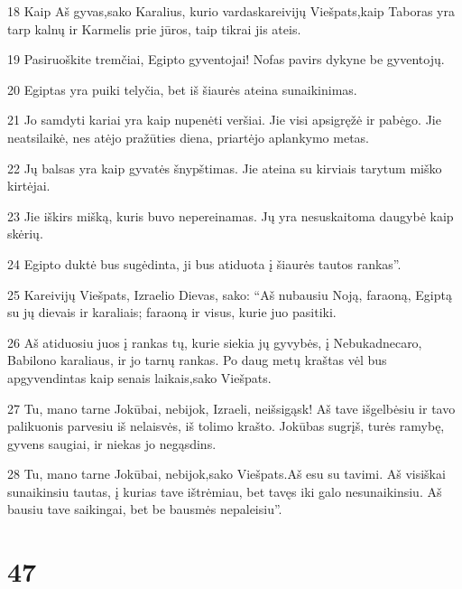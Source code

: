 \par 18 Kaip Aš gyvas,­sako Karalius, kurio vardas­kareivijų Viešpats,­kaip Taboras yra tarp kalnų ir Karmelis prie jūros, taip tikrai jis ateis. 
\par 19 Pasiruoškite tremčiai, Egipto gyventojai! Nofas pavirs dykyne be gyventojų. 
\par 20 Egiptas yra puiki telyčia, bet iš šiaurės ateina sunaikinimas. 
\par 21 Jo samdyti kariai yra kaip nupenėti veršiai. Jie visi apsigręžė ir pabėgo. Jie neatsilaikė, nes atėjo pražūties diena, priartėjo aplankymo metas. 
\par 22 Jų balsas yra kaip gyvatės šnypštimas. Jie ateina su kirviais tarytum miško kirtėjai. 
\par 23 Jie iškirs mišką, kuris buvo nepereinamas. Jų yra nesuskaitoma daugybė kaip skėrių. 
\par 24 Egipto duktė bus sugėdinta, ji bus atiduota į šiaurės tautos rankas”. 
\par 25 Kareivijų Viešpats, Izraelio Dievas, sako: “Aš nubausiu Noją, faraoną, Egiptą su jų dievais ir karaliais; faraoną ir visus, kurie juo pasitiki. 
\par 26 Aš atiduosiu juos į rankas tų, kurie siekia jų gyvybės, į Nebukadnecaro, Babilono karaliaus, ir jo tarnų rankas. Po daug metų kraštas vėl bus apgyvendintas kaip senais laikais,­sako Viešpats.­ 
\par 27 Tu, mano tarne Jokūbai, nebijok, Izraeli, neišsigąsk! Aš tave išgelbėsiu ir tavo palikuonis parvesiu iš nelaisvės, iš tolimo krašto. Jokūbas sugrįš, turės ramybę, gyvens saugiai, ir niekas jo negąsdins. 
\par 28 Tu, mano tarne Jokūbai, nebijok,­sako Viešpats.­Aš esu su tavimi. Aš visiškai sunaikinsiu tautas, į kurias tave ištrėmiau, bet tavęs iki galo nesunaikinsiu. Aš bausiu tave saikingai, bet be bausmės nepaleisiu”.



\chapter{47}


